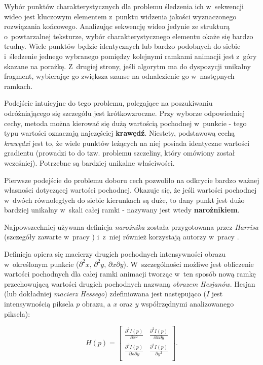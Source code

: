     Wybór punktów charakterystycznych dla problemu śledzenia ich w~sekwencji wideo jest kluczowym elementem z~punktu widzenia jakości wyznaczonego rozwiązania końcowego. Analizując sekwencję wideo jedynie ze strukturą o~powtarzalnej teksturze, wybór charakterystycznego elementu okaże się bardzo trudny. Wiele punktów będzie identycznych lub bardzo podobnych do siebie i~śledzenie jednego wybranego pomiędzy kolejnymi ramkami animacji jest z~góry skazane na porażkę. Z~drugiej strony, jeśli algorytm ma do dyspozycji unikalny fragment, wybierając go zwiększa szanse na odnalezienie go w~następnych ramkach.

    Podejście intuicyjne do tego problemu, polegające na poszukiwaniu odróżniającego się szczegółu jest krótkowzroczne. Przy wyborze odpowiedniej cechy, metoda można kierować się dużą wartością pochodnej w~punkcie - tego typu wartości oznaczają najczęściej \textbf{krawędź}. Niestety, podstawową cechą \textit{krawędzi} jest to, że wiele punktów leżących na niej posiada identyczne wartości gradientu (prowadzi to do tzw. problemu szczeliny, który omówiony został wcześniej). Potrzebne są bardziej unikalne właściwości.

    Pierwsze podejście do problemu doboru cech pozwoliło na odkrycie bardzo ważnej własności dotyczącej wartości pochodnej. Okazuje się, że jeśli wartości pochodnej w~dwóch równoległych do siebie kierunkach są duże, to dany punkt jest dużo bardziej unikalny w~skali całej ramki - nazywany jest wtedy \textbf{narożnikiem}.

    Najpowszechniej używana definicja \textit{narożnika} została przygotowana przez \textit{Harrisa} (szczegóły zawarte w~pracy \cite{Harris88}) i~z~niej również korzystają autorzy w~pracy \cite{GoodFeaturesToTrack94}.

    Definicja opiera się macierzy drugich pochodnych intensywności obrazu w~określonym punkcie ($\partial^2 x$, $\partial^2 y$, $\partial x\partial y$). W~szczególności możliwe jest obliczenie wartości pochodnych dla całej ramki animacji tworząc w~ten sposób nową ramkę przechowującą wartości drugich pochodnych nazwaną \textit{obrazem Hesjanów}. Hesjan (lub dokładniej \textit{macierz Hessego}) zdefiniowana jest następująco ($I$ jest intensywnością piksela $p$ obrazu, a $x$ oraz $y$ współrzędnymi analizowanego piksela):

      \begin{equation}
        H(p) =
          \begin{bmatrix}
            \frac{\partial^2 I(p)}{\partial x^2} & \frac{\partial^2 I(p)}{\partial x\partial y} \\
            \frac{\partial^2 I(p)}{\partial x\partial y} & \frac{\partial^2 I(p)}{\partial y^2} \\
          \end{bmatrix}.
      \end{equation}

